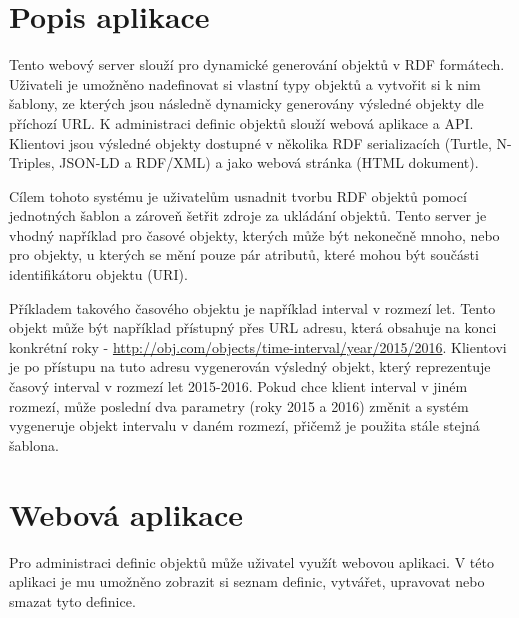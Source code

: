 \documentclass[thesis=B,czech]{FITthesis}[2012/06/26]
\begin{document}
  \section{Popis aplikace}
  Tento webový server slouží pro dynamické generování objektů v RDF formátech. Uživateli je umožněno nadefinovat si vlastní typy objektů a vytvořit si k nim
  šablony, ze kterých jsou následně dynamicky generovány výsledné objekty dle příchozí URL. K administraci definic objektů slouží webová aplikace a API.
  Klientovi jsou výsledné objekty dostupné v několika RDF serializacích (Turtle, N-Triples, JSON-LD a RDF/XML) a jako webová stránka (HTML dokument).
  
  Cílem tohoto systému je uživatelům usnadnit tvorbu RDF objektů pomocí jednotných šablon a zároveň šetřit zdroje za ukládání objektů. Tento server 
  je vhodný například pro časové objekty, kterých může být nekonečně mnoho, nebo pro objekty, u kterých se mění pouze pár atributů, které mohou být součásti
  identifikátoru objektu (URI).
  
  Příkladem takového časového objektu je například interval v rozmezí let. Tento objekt může být například přístupný přes URL adresu, která obsahuje na konci konkrétní roky - \url{http://obj.com/objects/time-interval/year/2015/2016}. Klientovi je po přístupu na tuto adresu vygenerován výsledný objekt, který reprezentuje
  časový interval v rozmezí let 2015-2016. Pokud chce klient interval v jiném rozmezí, může poslední dva parametry (roky 2015 a 2016) změnit a systém vygeneruje
  objekt intervalu v daném rozmezí, přičemž je použita stále stejná šablona.
  
  
  
  \section{Webová aplikace}
  Pro administraci definic objektů může uživatel využít webovou aplikaci. V této aplikaci je mu umožněno zobrazit si
  seznam definic, vytvářet, upravovat nebo smazat tyto definice.
  
\end{document}

